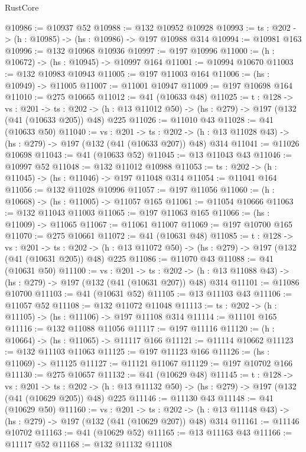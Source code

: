 \begin{lexlean}{RustCore}
\begin{coremodule}
@10986 := @10937 @52
@10988 := @132 @10952 @10928
@10993 := {ts : @202} -> (h : @10985) -> (hs : @10986) -> @197 @10988 @314
@10994 := @10981 @163
@10996 := @132 @10968 @10936
@10997 := @197 @10996
@11000 := (h : @10672) -> (hs : @10945) -> @10997 @164
@11001 := @10994 @10670
@11003 := @132 @10983 @10943
@11005 := @197 @11003 @164
@11006 := (hs : @10949) -> @11005
@11007 := @11001 @10947
@11009 := @197 @10698 @164
@11010 := @275 @10665
@11012 := @41 (@10633 @48)
@11025 := {t : @128} ->
  {vs : @201} ->
  {ts : @202} -> (h : @13 @11012 @50) -> (hs : @279) -> @197 (@132 (@41 (@10633 @205)) @48) @225
@11026 := @11010 @43
@11028 := @41 (@10633 @50)
@11040 := {vs : @201} ->
  {ts : @202} -> (h : @13 @11028 @43) -> (hs : @279) -> @197 (@132 (@41 (@10633 @207)) @48) @314
@11041 := @11026 @10698
@11043 := @41 (@10633 @52)
@11045 := @13 @11043 @43
@11046 := @10997 @52
@11048 := @132 @11012 @10988
@11053 := {ts : @202} -> (h : @11045) -> (hs : @11046) -> @197 @11048 @314
@11054 := @11041 @164
@11056 := @132 @11028 @10996
@11057 := @197 @11056
@11060 := (h : @10668) -> (hs : @11005) -> @11057 @165
@11061 := @11054 @10666
@11063 := @132 @11043 @11003
@11065 := @197 @11063 @165
@11066 := (hs : @11009) -> @11065
@11067 := @11061 @11007
@11069 := @197 @10700 @165
@11070 := @275 @10661
@11072 := @41 (@10631 @48)
@11085 := {t : @128} ->
  {vs : @201} ->
  {ts : @202} -> (h : @13 @11072 @50) -> (hs : @279) -> @197 (@132 (@41 (@10631 @205)) @48) @225
@11086 := @11070 @43
@11088 := @41 (@10631 @50)
@11100 := {vs : @201} ->
  {ts : @202} -> (h : @13 @11088 @43) -> (hs : @279) -> @197 (@132 (@41 (@10631 @207)) @48) @314
@11101 := @11086 @10700
@11103 := @41 (@10631 @52)
@11105 := @13 @11103 @43
@11106 := @11057 @52
@11108 := @132 @11072 @11048
@11113 := {ts : @202} -> (h : @11105) -> (hs : @11106) -> @197 @11108 @314
@11114 := @11101 @165
@11116 := @132 @11088 @11056
@11117 := @197 @11116
@11120 := (h : @10664) -> (hs : @11065) -> @11117 @166
@11121 := @11114 @10662
@11123 := @132 @11103 @11063
@11125 := @197 @11123 @166
@11126 := (hs : @11069) -> @11125
@11127 := @11121 @11067
@11129 := @197 @10702 @166
@11130 := @275 @10657
@11132 := @41 (@10629 @48)
@11145 := {t : @128} ->
  {vs : @201} ->
  {ts : @202} -> (h : @13 @11132 @50) -> (hs : @279) -> @197 (@132 (@41 (@10629 @205)) @48) @225
@11146 := @11130 @43
@11148 := @41 (@10629 @50)
@11160 := {vs : @201} ->
  {ts : @202} -> (h : @13 @11148 @43) -> (hs : @279) -> @197 (@132 (@41 (@10629 @207)) @48) @314
@11161 := @11146 @10702
@11163 := @41 (@10629 @52)
@11165 := @13 @11163 @43
@11166 := @11117 @52
@11168 := @132 @11132 @11108

\end{coremodule}
\end{lexlean}
